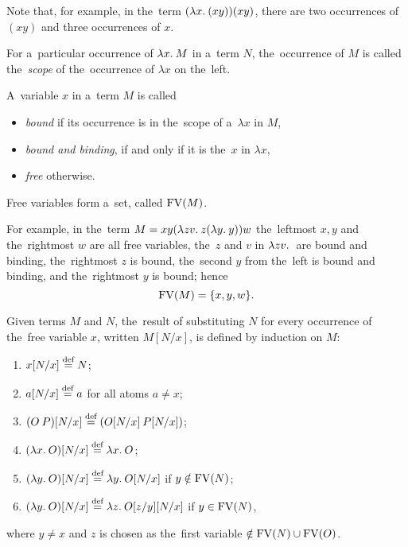 Note that, for example, in the~term $(\lambda x . \: ( x y)) (x y)$, there are two
occurrences of $(x y)$ and three occurrences of $x$.

\begin{definition}
  For a~particular occurrence of $\lambda x . \: M$ in a~term $N$, the~occurrence of $M$
  is called the~\emph{scope} of the~occurrence of $\lambda x$ on the~left.
\end{definition}

\begin{definition}
  A~variable $x$ in a~term $M$ is called
  \begin{itemize}
    \item \emph{bound} if its occurrence is in the~scope of a~$\lambda x$ in
      $M$,
    \item \emph{bound and binding}, if and only if it is the~$x$ in $\lambda x$,
    \item \emph{free} otherwise.
  \end{itemize}
  Free variables form a~set, called $\mathrm{FV}(M)$.
\end{definition}

For example, in the~term $M = xy(\lambda zv . \: z (\lambda y . \: y))w$ the~leftmost $x, y$
and the~rightmost $w$ are all free variables, the~$z$ and $v$ in $\lambda zv . \: $
are bound and binding, the~rightmost $z$ is bound, the~second $y$ from the~left
is bound and binding, and the~rightmost $y$ is bound; hence
\[
  \mathrm{FV}(M) = \{x, y, w\} .
\]

\begin{definition}[Substitution]\label{def:substitution}
  Given terms $M$ and $N$, the~result of substituting $N$ for every occurrence
  of the~free variable $x$, written $M[N/x]$, is defined by induction on $M$:
  \begin{enumerate}
    \item $x[N/x] \overset{\textrm{def}}{=} N$;
    \item $a[N/x] \overset{\textrm{def}}{=} a$ \hfill for all atoms $a \neq x$;
    \item $(O \: P)[N/x] \overset{\textrm{def}}{=} (O[N/x] \: P[N/x])$;
    \item $(\lambda x . \: O)[N/x] \overset{\textrm{def}}{=} \lambda x . \: O$;
    \item $(\lambda y . \: O)[N/x] \overset{\textrm{def}}{=} \lambda y . \: O[N/x]$ \hfill if $y \notin \mathrm{FV}(N)$;
    \item \label{def:substitution:g_item} $(\lambda y . \: O)[N/x]
      \overset{\textrm{def}}{=} \lambda z . \: O[z/y][N/x]$ \hfill if $y \in \mathrm{FV}(N)$,
    \setcounter{subst_enum}{\value{enumi}}
  \end{enumerate}
  where $y \neq x$ and $z$ is chosen as the~first variable $\notin \mathrm{FV}(N)
  \cup \mathrm{FV}(O)$.
\end{definition}

